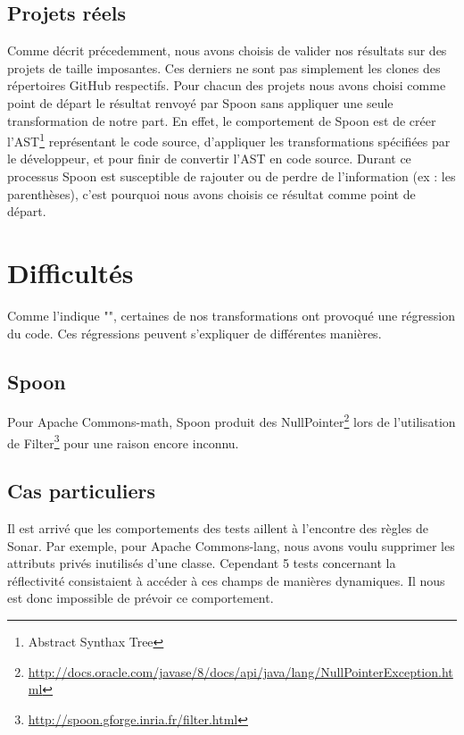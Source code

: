 \documentclass[a4paper]{article}
\begin{document}
\subsection{Projets réels}
\par Comme décrit précedemment, nous avons choisis de valider nos résultats sur des projets de taille imposantes. Ces derniers ne sont pas simplement les clones des répertoires GitHub respectifs. Pour chacun des projets nous avons choisi comme point de départ le résultat renvoyé par Spoon sans appliquer une seule transformation de notre part. En effet, le comportement de Spoon est de créer l'AST\footnote{Abstract Synthax Tree} représentant le code source, d'appliquer les transformations spécifiées par le développeur, et pour finir de convertir l'AST en code source. Durant ce processus Spoon est susceptible de rajouter ou de perdre de l'information (ex : les parenthèses), c'est pourquoi nous avons choisis ce résultat comme point de départ.


\section{Difficultés}
\par Comme l'indique "", certaines de nos transformations ont provoqué une régression du code. Ces régressions peuvent s'expliquer de différentes manières.

\subsection{Spoon}
\par Pour Apache Commons-math, Spoon produit des NullPointer\footnote{\url{http://docs.oracle.com/javase/8/docs/api/java/lang/NullPointerException.html}} lors de l'utilisation de Filter\footnote{\url{http://spoon.gforge.inria.fr/filter.html}} pour une raison encore inconnu.

\subsection{Cas particuliers}
\par Il est arrivé que les comportements des tests aillent à l'encontre des règles de Sonar. Par exemple, pour Apache Commons-lang, nous avons voulu supprimer les attributs privés inutilisés d'une classe. Cependant 5 tests concernant la réflectivité consistaient à accéder à ces champs de manières dynamiques. Il nous est donc impossible de prévoir ce comportement.
\end{document}
